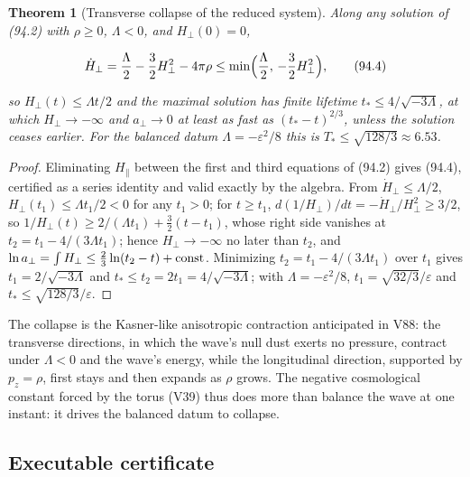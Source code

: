\documentclass[11pt]{article}
\newtheorem{theorem}{Theorem}[section]
\theoremstyle{remark}
\begin{document}
\begin{theorem}[Transverse collapse of the reduced system]
\label{thm:v19v91-collapse}
Along any solution of (94.2) with \(\rho\geq0\), \(\Lambda<0\), and
\(H_\perp(0)=0\),

\[
 \dot H_\perp=\frac\Lambda2-\frac32H_\perp^2-4\pi\rho\leq\min\Bigl(\frac\Lambda2,\,-\frac32H_\perp^2\Bigr),
                                                                    \tag{94.4}
\]

so \(H_\perp(t)\leq\Lambda t/2\) and the maximal solution has finite
lifetime \(t_*\leq4/\sqrt{-3\Lambda}\), at which
\(H_\perp\to-\infty\) and \(a_\perp\to0\) at least as fast as
\((t_*-t)^{2/3}\), unless the solution ceases earlier.  For the
balanced datum \(\Lambda=-\varepsilon^2/8\) this is
\(T_*\leq\sqrt{128/3}\approx6.53\).
\end{theorem}

\begin{proof}
Eliminating \(H_\parallel\) between the first and third equations of
(94.2) gives (94.4), certified as a series identity and valid exactly
by the algebra.  From \(\dot H_\perp\leq\Lambda/2\),
\(H_\perp(t_1)\leq\Lambda t_1/2<0\) for any \(t_1>0\); for
\(t\geq t_1\), \(d(1/H_\perp)/dt=-\dot H_\perp/H_\perp^2\geq3/2\), so
\(1/H_\perp(t)\geq2/(\Lambda t_1)+\tfrac32(t-t_1)\), whose right side
vanishes at \(t_2=t_1-4/(3\Lambda t_1)\); hence \(H_\perp\to-\infty\)
no later than \(t_2\), and \(\ln a_\perp=\int H_\perp\leq\tfrac23\ln(t_2-t)+\hbox{const}\).
Minimizing \(t_2=t_1-4/(3\Lambda t_1)\) over \(t_1\) gives
\(t_1=2/\sqrt{-3\Lambda}\) and \(t_*\leq t_2=2t_1=4/\sqrt{-3\Lambda}\);
with \(\Lambda=-\varepsilon^2/8\), \(t_1=\sqrt{32/3}/\varepsilon\) and
\(t_*\leq\sqrt{128/3}/\varepsilon\).
\end{proof}

The collapse is the Kasner-like anisotropic contraction anticipated
in V88: the transverse directions, in which the wave's null dust
exerts no pressure, contract under \(\Lambda<0\) and the wave's
energy, while the longitudinal direction, supported by \(p_z=\rho\),
first stays and then expands as \(\rho\) grows.  The negative
cosmological constant forced by the torus (V39) thus does more than
balance the wave at one instant: it drives the balanced datum to
collapse.

\subsection{Executable certificate}
\end{document}
